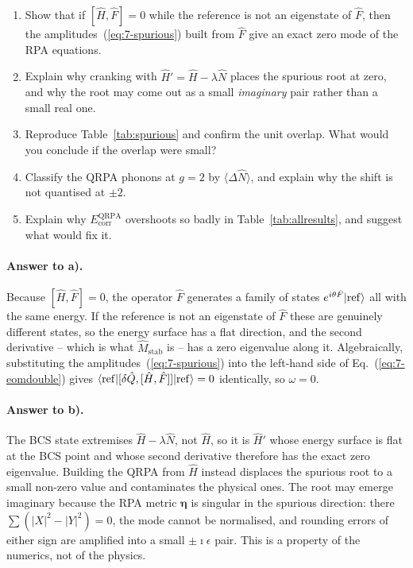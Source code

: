 \begin{enumerate}
  \item[a)] Show that if $[\hat{H},\hat{F}]=0$ while the reference is not an
  eigenstate of $\hat{F}$, then the amplitudes~(\ref{eq:7-spurious}) built
  from $\hat{F}$ give an exact zero mode of the RPA equations.
  \item[b)] Explain why cranking with $\hat{H}'=\hat{H}-\lambda\hat{N}$
  places the spurious root at zero, and why the root may come out as a small
  \emph{imaginary} pair rather than a small real one.
  \item[c)] Reproduce Table~\ref{tab:spurious} and confirm the unit overlap.
  What would you conclude if the overlap were small?
  \item[d)] Classify the QRPA phonons at $g=2$ by
  $\langle\Delta\hat{N}\rangle$, and explain why the shift is not quantised
  at $\pm2$.
  \item[e)] Explain why $E^{\mathrm{QRPA}}_{\mathrm{corr}}$ overshoots so
  badly in Table~\ref{tab:allresults}, and suggest what would fix it.
\end{enumerate}

\paragraph{Answer to a).}
Because $[\hat{H},\hat{F}]=0$, the operator $\hat{F}$ generates a family of
states $e^{i\theta\hat{F}}\vert \mathrm{ref} \rangle$ all with the same energy.
If the reference is not an eigenstate of $\hat{F}$ these are genuinely
different states, so the energy surface has a flat direction, and the second
derivative -- which is what $\hat{M}_{\mathrm{stab}}$ is -- has a zero
eigenvalue along it.  Algebraically, substituting the
amplitudes~(\ref{eq:7-spurious}) into the left-hand side of
Eq.~(\ref{eq:7-eomdouble}) gives
$\langle \mathrm{ref} | [\delta\hat{Q},[\hat{H},\hat{F}]] | \mathrm{ref} \rangle=0$
identically, so $\omega=0$.

\paragraph{Answer to b).}
The BCS state extremises $\hat{H}-\lambda\hat{N}$, not $\hat{H}$, so it is
$\hat{H}'$ whose energy surface is flat at the BCS point and whose second
derivative therefore has the exact zero eigenvalue.  Building the QRPA from
$\hat{H}$ instead displaces the spurious root to a small non-zero value and
contaminates the physical ones.  The root may emerge imaginary because the RPA
metric $\bm{\eta}$ is singular in the spurious direction: there
$\sum(|X|^2-|Y|^2)=0$, the mode cannot be normalised, and rounding errors of
either sign are amplified into a small $\pm\imath\epsilon$ pair.  This is a
property of the numerics, not of the physics.

